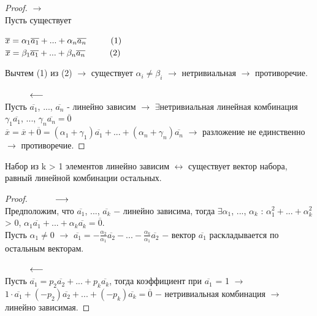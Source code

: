 \begin{proof}
	\tab
	$\longrightarrow$\\
	Пусть существует
	\begin{center}
		$\overline{x}=\alpha_1\overline{a_1}+...+\alpha_n\overline{a_n}\hspace*{1cm}(1)$\\
		$\overline{x}=\beta_1\overline{a_1}+...+\beta_n\overline{a_n}\hspace*{1cm}(2)$
	\end{center}
	Вычтем (1) из (2) $\longrightarrow$ существует $\alpha_i\neq\beta_i$ $\longrightarrow$ нетривиальная $\longrightarrow$ противоречие.
	
	$\hspace*{1cm}\longleftarrow$\\
	Пусть $\overline{a_1}$, ..., $\overline{a_n}$ - линейно зависим $\longrightarrow$ $\exists$нетривиальная линейная комбинация $\gamma_1\overline{a_1}$, ..., $\gamma_n\overline{a_n} = \overline{0}$\\
	
	$\overline{x} = \overline{x} + \overline{0} = (\alpha_1 + \gamma_1)\overline{a_1}+...+(\alpha_n + \gamma_n)\overline{a_n}$ $\longrightarrow$ разложение не единственно $\longrightarrow$ противоречие.
\end{proof}

\begin{theorem}
	Набор из k > 1 элементов линейно зависим $\longleftrightarrow$ существует вектор набора, равный линейной комбинации остальных.
\end{theorem}
\begin{proof}
	$\hspace*{1cm}\longrightarrow$\\
	Предположим, что $\overline{a_1}$, ..., $\overline{a_k}$ $-$ линейно зависима, тогда $\exists\alpha_1$, ..., $\alpha_k$ :  $\alpha_1^2+...+\alpha_k^2$ > 0, $\alpha_1\overline{a_1}+...+\alpha_k\overline{a_k}=\overline{0}$.\\
	Пусть $\alpha_1\neq0$ $\longrightarrow$ $\overline{a_1} = -\frac{\alpha_2}{\alpha_1}\overline{a_2}-...-\frac{\alpha_k}{\alpha_1}\overline{a_2}$ $-$ вектор $\overline{a_1}$ раскладывается по остальным векторам.
	
	$\hspace*{1cm}\longleftarrow$\\
	Пусть $\overline{a_1} = p_2\overline{a_2}+...+p_k\overline{a_k}$, тогда коэффициент при $\overline{a_1}$ = 1 $\longrightarrow$ $1\cdot\overline{a_1}+(-p_2)\overline{a_2}+...+(-p_k)\overline{a_k}=\overline{0}$ $-$ нетривиальная комбинация $\longrightarrow$ линейно зависимая.
\end{proof}

